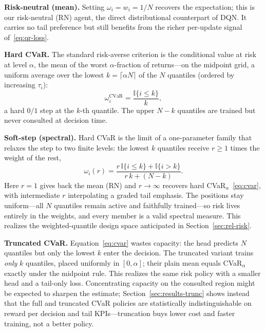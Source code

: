 \documentclass[conference]{IEEEtran}
\begin{document}
\textbf{Risk-neutral (mean).} Setting $\omega_i=w_i=1/N$ recovers the
expectation; this is our risk-neutral (RN) agent, the direct distributional
counterpart of DQN. It carries no tail preference but still benefits from the
richer per-update signal of~\eqref{eq:qr-loss}.

\textbf{Hard CVaR.} The standard risk-averse criterion is the conditional value
at risk at level $\alpha$, the mean of the worst $\alpha$-fraction of returns---on
the midpoint grid, a uniform average over the lowest $k=\lceil\alpha N\rceil$ of
the $N$ quantiles (ordered by increasing $\tau_i$):
\begin{equation}
\omega_i^{\mathrm{CVaR}} = \frac{\mathbb{I}\{i\le k\}}{k},
\label{eq:cvar}
\end{equation}
a hard $0/1$ step at the $k$-th quantile. The upper $N-k$ quantiles are
trained but never consulted at decision time.

\textbf{Soft-step (spectral).} Hard CVaR is the limit of a one-parameter family
that relaxes the step to two finite levels: the lowest $k$ quantiles receive
$r\ge 1$ times the weight of the rest,
\begin{equation}
\omega_i(r) =
\frac{r\,\mathbb{I}\{i\le k\} + \mathbb{I}\{i>k\}}{r\,k + (N-k)} .
\label{eq:softstep}
\end{equation}
Here $r{=}1$ gives back the mean (RN) and $r\to\infty$ recovers hard
CVaR$_\alpha$~\eqref{eq:cvar}, with intermediate $r$ interpolating a graded tail
emphasis. The positions stay uniform---all $N$ quantiles remain active and
faithfully trained---so risk lives entirely in the weights, and every member is a
valid spectral measure. This realizes the weighted-quantile design space
anticipated in Section~\ref{sec:rel-risk}.

\textbf{Truncated CVaR.} Equation~\eqref{eq:cvar} wastes capacity: the head
predicts $N$ quantiles but only the lowest $k$ enter the decision. The truncated
variant trains \emph{only} $k$ quantiles, placed uniformly
in $[0,\alpha]$; their plain mean equals CVaR$_\alpha$ exactly under the midpoint
rule. This realizes the same risk policy with a smaller head and a tail-only
loss. Concentrating capacity on the consulted region might be expected to sharpen
the estimate; Section~\ref{sec:results-trunc} shows instead that the full and
truncated CVaR policies are statistically indistinguishable on reward per decision
and tail KPIs---truncation buys lower cost and faster training, not a better
policy.
\end{document}
